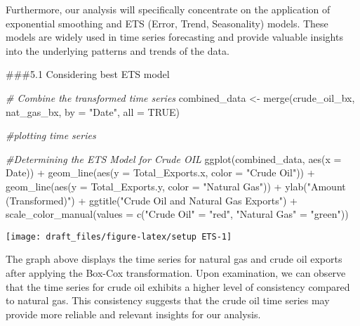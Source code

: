 \documentclass[
]{article}
\newenvironment{Shaded}{\begin{snugshade}}{\end{snugshade}}
\newcommand{\AttributeTok}[1]{\textcolor[rgb]{0.77,0.63,0.00}{#1}}
\newcommand{\CommentTok}[1]{\textcolor[rgb]{0.56,0.35,0.01}{\textit{#1}}}
\newcommand{\ConstantTok}[1]{\textcolor[rgb]{0.00,0.00,0.00}{#1}}
\newcommand{\FunctionTok}[1]{\textcolor[rgb]{0.00,0.00,0.00}{#1}}
\newcommand{\NormalTok}[1]{#1}
\newcommand{\OtherTok}[1]{\textcolor[rgb]{0.56,0.35,0.01}{#1}}
\newcommand{\SpecialCharTok}[1]{\textcolor[rgb]{0.00,0.00,0.00}{#1}}
\newcommand{\StringTok}[1]{\textcolor[rgb]{0.31,0.60,0.02}{#1}}
\begin{document}
Furthermore, our analysis will specifically concentrate on the
application of exponential smoothing and ETS (Error, Trend, Seasonality)
models. These models are widely used in time series forecasting and
provide valuable insights into the underlying patterns and trends of the
data.

\#\#\#5.1 Considering best ETS model

\begin{Shaded}
\begin{Highlighting}[]
\CommentTok{\# Combine the transformed time series}
\NormalTok{combined\_data }\OtherTok{\textless{}{-}} \FunctionTok{merge}\NormalTok{(crude\_oil\_bx, nat\_gas\_bx, }\AttributeTok{by =} \StringTok{"Date"}\NormalTok{, }\AttributeTok{all =} \ConstantTok{TRUE}\NormalTok{)}

\CommentTok{\#plotting time series}

\CommentTok{\#Determining the ETS Model for Crude OIL}
\FunctionTok{ggplot}\NormalTok{(combined\_data, }\FunctionTok{aes}\NormalTok{(}\AttributeTok{x =}\NormalTok{ Date)) }\SpecialCharTok{+}
  \FunctionTok{geom\_line}\NormalTok{(}\FunctionTok{aes}\NormalTok{(}\AttributeTok{y =}\NormalTok{ Total\_Exports.x, }\AttributeTok{color =} \StringTok{"Crude Oil"}\NormalTok{)) }\SpecialCharTok{+}
  \FunctionTok{geom\_line}\NormalTok{(}\FunctionTok{aes}\NormalTok{(}\AttributeTok{y =}\NormalTok{ Total\_Exports.y, }\AttributeTok{color =} \StringTok{"Natural Gas"}\NormalTok{)) }\SpecialCharTok{+}
  \FunctionTok{ylab}\NormalTok{(}\StringTok{"Amount (Transformed)"}\NormalTok{) }\SpecialCharTok{+}
  \FunctionTok{ggtitle}\NormalTok{(}\StringTok{"Crude Oil and Natural Gas Exports"}\NormalTok{) }\SpecialCharTok{+}
  \FunctionTok{scale\_color\_manual}\NormalTok{(}\AttributeTok{values =} \FunctionTok{c}\NormalTok{(}\StringTok{"Crude Oil"} \OtherTok{=} \StringTok{"red"}\NormalTok{, }\StringTok{"Natural Gas"} \OtherTok{=} \StringTok{"green"}\NormalTok{))}
\end{Highlighting}
\end{Shaded}

\begin{center}\texttt{[image: draft\_files/figure-latex/setup ETS-1]} \end{center}

The graph above displays the time series for natural gas and crude oil
exports after applying the Box-Cox transformation. Upon examination, we
can observe that the time series for crude oil exhibits a higher level
of consistency compared to natural gas. This consistency suggests that
the crude oil time series may provide more reliable and relevant
insights for our analysis.
\end{document}
